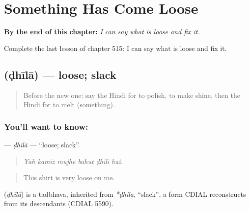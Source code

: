 
\chapter{Something Has Come Loose}
\label{ch:hi-something-has-come-loose}

\begin{chapteropening}
\textbf{By the end of this chapter:} \emph{I can say what is loose and fix it.}

Complete the last lesson of chapter 515: I can say what is loose and fix it.
\end{chapteropening}

\section[\texorpdfstring{\hi{ढीला} (ḍhīlā)}{ढीला (ḍhīlā)}]{ (ḍhīlā) — loose; slack}

\label{lesson:HI-C515-dhila}



\begin{quote}
Before the new one: say the Hindi for to polish, to make shine, then the Hindi for to melt (something).
\end{quote}

\subsection*{You'll want to know: }
\textbf{} — \emph{ḍhīlā} — \textquotedblleft{}loose; slack\textquotedblright{}.

\begin{quote}
     
\end{quote}

\begin{quote}
\emph{Yah kamīz mujhe bahut ḍhīlī hai.}
\end{quote}

\begin{quote}
This shirt is very loose on me.
\end{quote}

\begin{cousinweb}
\textbf{} (\emph{ḍhīlā}) is a tadbhava, inherited from \emph{*ḍhila}, \textquotedblleft{}slack\textquotedblright{}, a form CDIAL reconstructs from its descendants (CDIAL 5590).
\end{cousinweb}

